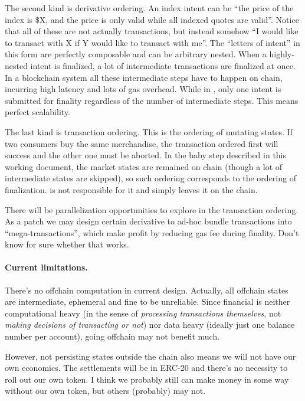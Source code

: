 The second kind is derivative ordering.
An index intent can be ``the price of the index is \$X, and the price is only valid while all indexed quotes are valid''.
Notice that all of these are not actually transactions, but instead somehow ``I would like to transact with X if Y would like to transact with me''.
The ``letters of intent'' in this form are perfectly composable and can be arbitrary nested.
When a highly-nested intent is finalized, a lot of intermediate transactions are finalized at once.
In a blockchain system all these intermediate steps have to happen on chain, incurring high latency and lots of gas overhead.
While in \sys, only one intent is submitted for finality regardless of the number of intermediate steps.
This means perfect scalability.

The last kind is transaction ordering.
This is the ordering of mutating states.
If two consumers buy the same merchandise, the transaction ordered first will success and the other one must be aborted.
In the baby step described in this working document, the market states are remained on chain (though a lot of intermediate states are skipped), so such ordering corresponds to the ordering of finalization.
\sys is not responsible for it and simply leaves it on the chain.

There will be parallelization opportunities to explore in the transaction ordering.
As a patch we may design certain derivative to ad-hoc bundle transactions into ``mega-transactions'', which make profit by reducing gas fee during finality.
Don't know for sure whether that works.

\paragraph{Current limitations.}
There's no offchain computation in current design.
Actually, all offchain states are intermediate, ephemeral and fine to be unreliable.
Since financial is neither computational heavy (in the sense of \emph{processing transactions themselves}, not \emph{making decisions of transacting or not}) nor data heavy (ideally just one balance number per account), going offchain may not benefit much.

However, not persisting states outside the chain also means we will not have our own economics.
The settlements will be in ERC-20 and there's no necessity to roll out our own token.
I think we probably still can make money in some way without our own token, but others (probably) may not.

